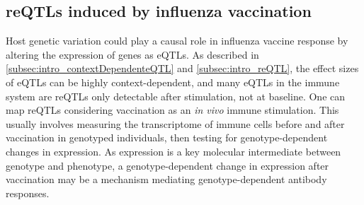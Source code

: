 
\subsection{reQTLs induced by influenza vaccination}
\label{subsec:hird_reQTL_following_influenza_vaccination}

Host genetic variation could play a causal role in influenza vaccine response by altering the expression of genes as \glspl{eQTL}.
As described in \cref{subsec:intro_contextDependenteQTL} and \cref{subsec:intro_reQTL}, the effect sizes of \glspl{eQTL} can be highly context-dependent,
and many \glspl{eQTL} in the immune system are \glspl{reQTL} only detectable after stimulation, not at baseline.
One can map \glspl{reQTL} considering vaccination as an \textit{in vivo} immune stimulation.
This usually involves measuring the transcriptome of immune cells before and after vaccination in genotyped individuals,
then testing for genotype-dependent changes in expression.
As expression is a key molecular intermediate between genotype and phenotype,
a genotype-dependent change in expression after vaccination may be a mechanism mediating genotype-dependent antibody responses.

